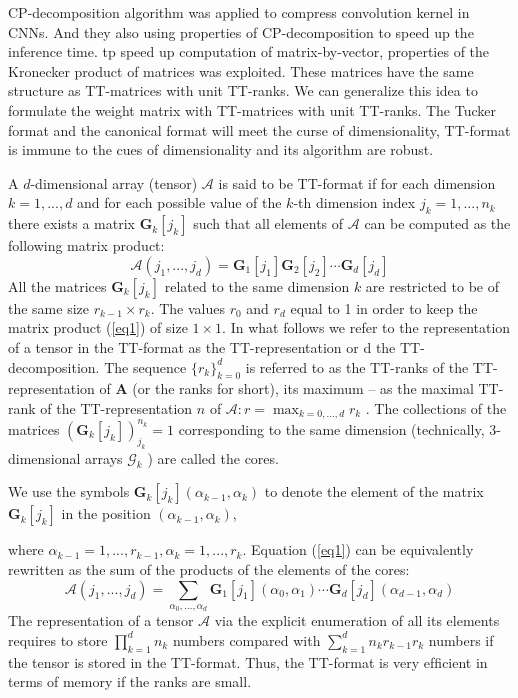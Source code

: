 \documentclass[onecolumn, conference]{IEEEtran}
\begin{document}
\par CP-decomposition algorithm was applied to compress convolution kernel in CNNs. And they also using properties of CP-decomposition to speed up the inference time.
tp speed up computation of matrix-by-vector, properties of the Kronecker product of matrices was exploited. These matrices have the same structure as TT-matrices with unit TT-ranks. We can generalize this idea to formulate the weight matrix with TT-matrices with unit TT-ranks. 
The Tucker format and the canonical format will meet the curse of dimensionality, TT-format is immune to the cues of dimensionality and its algorithm are robust. 
\par A $d$-dimensional array (tensor) $ \mathcal{A}$ is said to be TT-format if for each dimension $k=1,...,d$ and for each possible value of the $k$-th  dimension index $j_k=1,...,n_k$ there exists a matrix $\mathbf{G}_k[j_k]$ such that all elements of $\mathcal{A}$ can be computed as the following matrix product:
\begin{equation}
    \label{eq1}
    \mathcal{A}(j_1,...,j_d)=\mathbf{G}_1[j_1]\mathbf{G}_2[j_2]\cdots\mathbf{G}_d[j_d]
\end{equation}
All the matrices $\mathbf{G}_k[j_k]$ related to the same dimension $k$ are restricted to be of the same size $r_{k-1}\times r_k$. 
The values $r_0$ and $r_d$ equal to 1 in order to keep the matrix product (\ref{eq1}) of size $1\times 1$. 
In what follows we refer to the representation of a tensor in the TT-format as the TT-representation or d the TT-decomposition. 
The sequence $\{r_k \}^d_{k=0}$ is referred to as the TT-ranks of the TT-representation of $\mathbf{A}$ 
(or the ranks for short), its maximum – as the maximal TT-rank of the TT-representation $n$ of $\mathcal{A}: r = \max_{k=0,...,d} r_k$ . 
The collections of the matrices $(\mathbf{G}_k [j_k ])_{j_k}^{n_k} =1$ corresponding to the same dimension (technically, 3-dimensional arrays $\mathcal{G}_k$ ) are called the cores.

We use the symbols $\mathbf{G}_k[j_k](\alpha_{k-1},\alpha_k)$ to denote the element of the matrix $\mathbf{G}_k[j_k]$ in the position $(\alpha_{k-1},\alpha_k)$, 

where $\alpha_{k-1}=1,...,r_{k-1},\alpha_k=1,...,r_k$. Equation (\ref{eq1}) can be equivalently rewritten as the sum of the products of the elements of the cores:
\begin{equation}
    \label{eq2}
    \mathcal{A}(j_1,...,j_d)=\sum_{\alpha_0,...,\alpha_d} \mathbf{G}_1[j_1](\alpha_{0},\alpha_1)\cdots \mathbf{G}_d[j_d](\alpha_{d-1},\alpha_d)
\end{equation}
The representation of a tensor $\mathcal{A}$ via the explicit enumeration of all its elements requires to store 
$\prod_{k=1}^d n_k $ numbers compared with $\sum_{k=1}^d n_kr_{k-1}r_k$ numbers if the tensor is stored in the TT-format. 
Thus, the TT-format is very efﬁcient in terms of memory if the ranks are small.
\end{document}
